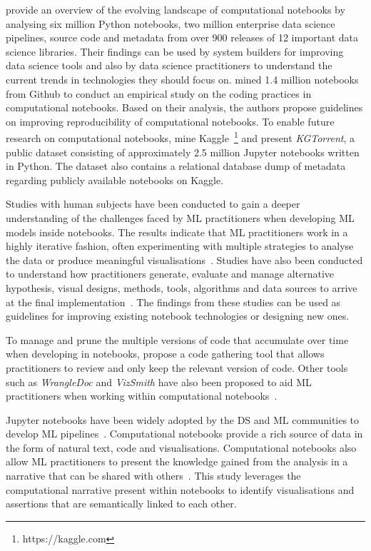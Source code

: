 \documentclass[conference]{IEEEtran}
\begin{document}
\cite{psallidas2019data} provide an overview of the evolving landscape of computational notebooks by analysing six million Python notebooks, two million enterprise data science pipelines, source code and metadata from over 900 releases of 12 important data science libraries. Their findings can be used by system builders for improving data science tools and also by data science practitioners to understand the current trends in technologies they should focus on. \cite{pimentel2019large} mined 1.4 million notebooks from Github to conduct an empirical study on the coding practices in computational notebooks. Based on their analysis, the authors propose guidelines on improving reproducibility of computational notebooks. To enable future research on computational notebooks, \cite{quaranta2021kgtorrent} mine Kaggle~\footnote{https://kaggle.com} and present \textit{KGTorrent}, a public dataset consisting of approximately 2.5 million Jupyter notebooks written in Python. The dataset also contains a relational database dump of metadata regarding publicly available notebooks on Kaggle.

Studies with human subjects have been conducted to gain a deeper understanding of the challenges faced by ML practitioners when developing ML models inside notebooks. The results indicate that ML practitioners work in a highly iterative fashion, often experimenting with multiple strategies to analyse the data or produce meaningful visualisations~\cite{kandel2012enterprise, kery2018story, liu2019understanding, chattopadhyay2020wrong}. Studies have also been conducted to understand how practitioners generate, evaluate and manage alternative hypothesis, visual designs, methods, tools, algorithms and data sources to arrive at the final implementation~\cite{liu2019understanding,kandel2012enterprise}. The findings from these studies can be used as guidelines for improving existing notebook technologies or designing new ones.

To manage and prune the multiple versions of code that accumulate over time when developing in notebooks, \cite{head2019managing} propose a code gathering tool that allows practitioners to review and only keep the relevant version of code. Other tools such as \textit{WrangleDoc} and \textit{VizSmith} have also been proposed to aid ML practitioners when working within computational notebooks~\cite{yang2021subtle, bavishi2021vizsmith}.

Jupyter notebooks have been widely adopted by the DS and ML communities to develop ML pipelines~\cite{wang2020assessing,pimentel2019large,quaranta2021kgtorrent}. Computational notebooks provide a rich source of data in the form of natural text, code and visualisations. Computational notebooks also allow ML practitioners to present the knowledge gained from the analysis in a narrative that can be shared with others~\cite{rule2018exploration}. This study leverages the computational narrative present within notebooks to identify visualisations and assertions that are semantically linked to each other.
\end{document}
